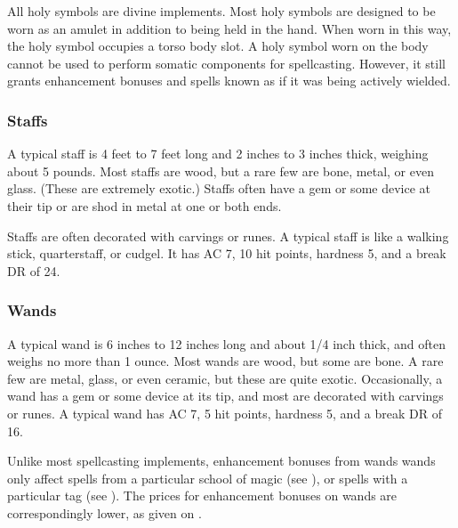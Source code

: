              All holy symbols are divine implements.
            Most holy symbols are designed to be worn as an amulet in addition to being held in the hand.
            When worn in this way, the holy symbol occupies a torso body slot.
            A holy symbol worn on the body cannot be used to perform somatic components for spellcasting.
            However, it still grants enhancement bonuses and spells known as if it was being actively wielded.

        \subsubsection{Staffs}

             A typical staff is 4 feet to 7 feet long and 2 inches to 3 inches thick, weighing about 5 pounds.
            Most staffs are wood, but a rare few are bone, metal, or even glass.
            (These are extremely exotic.)
            Staffs often have a gem or some device at their tip or are shod in metal at one or both ends.

            Staffs are often decorated with carvings or runes.
            A typical staff is like a walking stick, quarterstaff, or cudgel.
            It has AC 7, 10 hit points, hardness 5, and a break DR of 24.

        \subsubsection{Wands}

             A typical wand is 6 inches to 12 inches long and about 1/4 inch thick, and often weighs no more than 1 ounce.
            Most wands are wood, but some are bone.
            A rare few are metal, glass, or even ceramic, but these are quite exotic.
            Occasionally, a wand has a gem or some device at its tip, and most are decorated with carvings or runes.
            A typical wand has AC 7, 5 hit points, hardness 5, and a break DR of 16.

            Unlike most spellcasting implements, enhancement bonuses from wands wands only affect spells from a particular school of magic (see ), or spells with a particular tag (see ).
            The prices for enhancement bonuses on wands are correspondingly lower, as given on .

